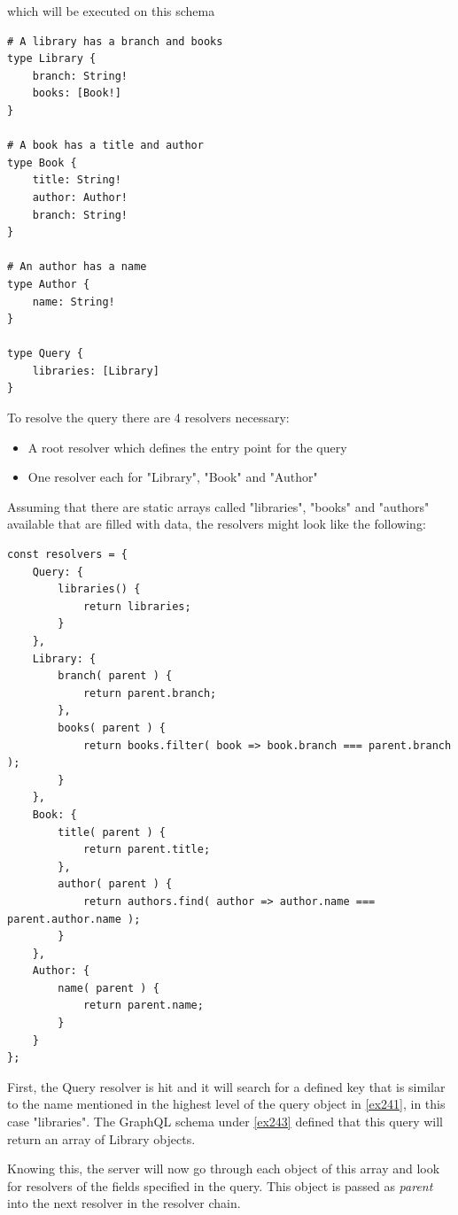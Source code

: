 which will be executed on this schema \citep[with adaptions]{ApolloResChain}
\begin{lstlisting}[caption={Schema Definition},label={ex243}]
# A library has a branch and books 
type Library { 
	branch: String! 
	books: [Book!] 
} 

# A book has a title and author 
type Book { 
	title: String! 
	author: Author! 
	branch: String! 
} 

# An author has a name 
type Author { 
	name: String!
} 

type Query { 
	libraries: [Library] 
}
\end{lstlisting}

\noindent
To resolve the query there are 4 resolvers necessary:
\begin{itemize}
\item A root resolver which defines the entry point for the query
\item One resolver each for "Library", "Book" and "Author"
\end{itemize}

\noindent
Assuming that there are static arrays called "libraries", "books" and "authors" available that are filled with data, the resolvers might look like the following: 
\citep[with adaptions]{ApolloResChain}

\lstset{language=JavaScript}
\begin{lstlisting}[caption={Resolver Definition},label={ex244}]
const resolvers = { 
	Query: { 
		libraries() { 
			return libraries; 
		} 
	}, 
	Library: { 
		branch( parent ) { 
			return parent.branch; 
		}, 
		books( parent ) { 
			return books.filter( book => book.branch === parent.branch ); 
		} 
	}, 
	Book: { 
		title( parent ) { 
			return parent.title; 
		}, 
		author( parent ) { 
			return authors.find( author => author.name === parent.author.name ); 
		} 
	}, 
	Author: { 
		name( parent ) { 
			return parent.name; 
		} 
	}
};
\end{lstlisting}

First, the Query resolver is hit and it will search for a defined key that is similar to the name mentioned in the highest level of the query object in \autoref{ex241}, in this case "libraries". The GraphQL schema under \autoref{ex243} defined that this query will return an array of Library objects.

Knowing this, the server will now go through each object of this array and look for resolvers of the fields specified in the query. This object is passed as \emph{parent} into the next resolver in the resolver chain.

